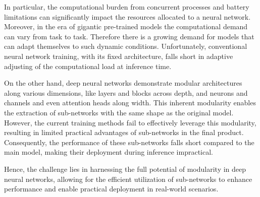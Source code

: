 \documentclass[letterpaper]{article} %
\begin{document}

In particular, the computational burden from concurrent processes and battery limitations can significantly impact the resources allocated to a neural network. Moreover, in the era of gigantic pre-trained models the computational demand can vary from task to task. Therefore there is a growing demand for models that can adapt themselves to such dynamic conditions. Unfortunately, conventional neural network training, with its fixed architecture, falls short in adaptive adjusting of the computational load at inference time.

On the other hand, deep neural networks demonstrate modular architectures along various dimensions, like layers and blocks across depth, and neurons and channels and even attention heads along width. This inherent modularity enables the extraction of sub-networks with the same shape as the original model. 
However, the current training methods fail to effectively leverage this modularity, resulting in limited practical advantages of sub-networks in the final product. Consequently, the performance of these sub-networks falls short compared to the main model, making their deployment during inference impractical.

Hence, the challenge lies in harnessing the full potential of modularity in deep neural networks, allowing for the efficient utilization of sub-networks to enhance performance and enable practical deployment in real-world scenarios.
\end{document}
